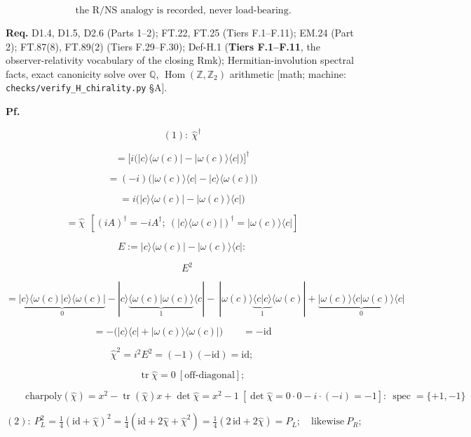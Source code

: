 \begin{theorem}
\[
\ \text{the R/NS analogy is recorded, never load-bearing}.
\]

\textbf{Req.} D1.4, D1.5, D2.6 (Parts 1–2); FT.22, FT.25 (Tiers F.1–F.11); EM.24 (Part 2); FT.87(8), FT.89(2) (Tiers F.29–F.30); Def-H.1 (\textbf{Tiers F.1–F.11}, the observer-relativity vocabulary of the closing Rmk); Hermitian-involution spectral facts, exact canonicity solve over $\mathbb Q$, $\operatorname{Hom}(\mathbb Z,\mathbb Z_2)$ arithmetic [math; machine: \texttt{checks/\allowbreak{}verify\_\allowbreak{}H\_\allowbreak{}chirality.py} §A].

\textbf{Pf.}

\[
(1):\ \hat\chi^\dagger
\]

\[
= \bigl[i\bigl(|c\rangle\langle\omega(c)|-|\omega(c)\rangle\langle c|\bigr)\bigr]^\dagger
\]

\[
= (-i)\bigl(|\omega(c)\rangle\langle c|-|c\rangle\langle\omega(c)|\bigr)
\]

\[
= i\bigl(|c\rangle\langle\omega(c)|-|\omega(c)\rangle\langle c|\bigr)
\]

\[
= \hat\chi\ \ [(iA)^\dagger=-iA^\dagger;\ (|c\rangle\langle\omega(c)|)^\dagger=|\omega(c)\rangle\langle c|]
\]

\[
E:=|c\rangle\langle\omega(c)|-|\omega(c)\rangle\langle c|:
\]

\[
\quad E^2
\]

\[
= \underbrace{|c\rangle\langle\omega(c)|c\rangle\langle\omega(c)|}_{0}-|c\rangle\underbrace{\langle\omega(c)|\omega(c)\rangle}_{1}\langle c|-\ |\omega(c)\rangle\underbrace{\langle c|c\rangle}_{1}\langle\omega(c)|+\underbrace{|\omega(c)\rangle\langle c|\omega(c)\rangle\langle c|}_{0}
\]

\[
= -\bigl(|c\rangle\langle c|+|\omega(c)\rangle\langle\omega(c)|\bigr)\qquad = -\mathrm{id}
\]

\[
\hat\chi^2=i^2E^2=(-1)(-\mathrm{id})=\mathrm{id};
\]

\[
\qquad \operatorname{tr}\hat\chi=0\ [\text{off-diagonal}];
\]

\[
\qquad \text{charpoly}(\hat\chi)=x^2-\operatorname{tr}(\hat\chi)x+\det\hat\chi=x^2-1\ [\det\hat\chi=0\cdot0-i\cdot(-i)=-1]:\ \operatorname{spec}=\{+1,-1\}
\]

\[
(2):\ P_L^2=\tfrac14(\mathrm{id}+\hat\chi)^2=\tfrac14(\mathrm{id}+2\hat\chi+\hat\chi^2)=\tfrac14(2\,\mathrm{id}+2\hat\chi)=P_L;\quad\text{likewise}\ P_R;
\]


\end{theorem}
